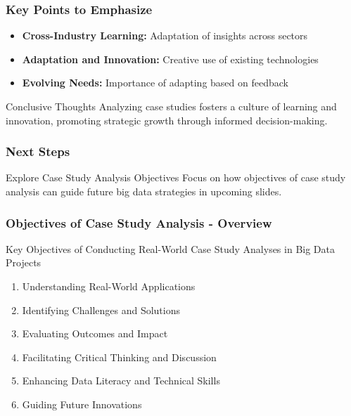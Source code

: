 \documentclass[aspectratio=169]{beamer}
\begin{document}
\begin{frame}[fragile]
    \frametitle{Key Points to Emphasize}
    
    \begin{itemize}
        \item \textbf{Cross-Industry Learning:} Adaptation of insights across sectors
        \item \textbf{Adaptation and Innovation:} Creative use of existing technologies
        \item \textbf{Evolving Needs:} Importance of adapting based on feedback
    \end{itemize}
    
    \begin{block}{Conclusive Thoughts}
        Analyzing case studies fosters a culture of learning and innovation, promoting strategic growth through informed decision-making.
    \end{block}
\end{frame}

\begin{frame}[fragile]
    \frametitle{Next Steps}
    
    \begin{block}{Explore Case Study Analysis Objectives}
        Focus on how objectives of case study analysis can guide future big data strategies in upcoming slides.
    \end{block}
\end{frame}

\begin{frame}[fragile]
    \frametitle{Objectives of Case Study Analysis - Overview}
    \begin{block}{Key Objectives of Conducting Real-World Case Study Analyses in Big Data Projects}
        \begin{enumerate}
            \item Understanding Real-World Applications
            \item Identifying Challenges and Solutions
            \item Evaluating Outcomes and Impact
            \item Facilitating Critical Thinking and Discussion
            \item Enhancing Data Literacy and Technical Skills
            \item Guiding Future Innovations
        \end{enumerate}
    \end{block}
\end{frame}
\end{document}
